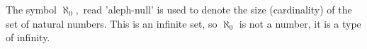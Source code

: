 The symbol $ \aleph _{0} , $ read 'aleph-null' is used to denote the size (cardinality)
of the set of natural numbers. This is an infinite set, so $ \aleph _{0} $ is
not a number, it is a type of infinity.